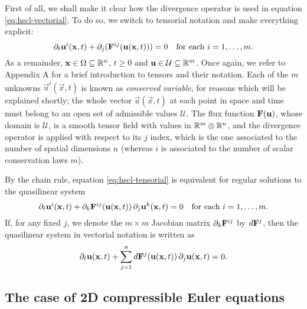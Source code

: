 First of all, we shall make it clear how the divergence operator
is used in equation \eqref{eq:hscl-vectorial}.
To do so, we switch to tensorial notation and make everything explicit:
\begin{equation} \label{eq:hscl-tensorial}
\partial_t \mathbf{u}^i(\mathbf{x},t) + \partial_j (\mathbf{F}^{ij}(\mathbf{u}(\mathbf{x},t))) = 0
\quad \text{for each $i = 1, \dots, m$.}
\end{equation}
As a remainder, $\mathbf{x} \in \Omega \subseteq \mathbb{R}^n$, $t \geq 0$ and
$\mathbf{u} \in \mathcal{U} \subseteq \mathbb{R}^m$.
Once again, we refer to Appendix A for a brief introduction
to tensors and their notation.
Each of the $m$ unknowns $\vec{u}^i(\vec{x},t)$ is known as
\emph{conserved variable}, for reasons which will be explained shortly;
the whole vector $\vec{u}(\vec{x},t)$ at each point in space and time must belong
to an open set of admissible values $\mathcal{U}$.
The flux function $\mathbf{F}(\mathbf{u})$, whose domain is $\mathcal{U}$,
is a smooth tensor field with values in $\mathbb{R}^m \otimes \mathbb{R}^n$,
and the divergence operator is applied with respect
to its $j$ index, which is the one associated to the number
of spatial dimensions $n$ (whereas $i$ is associated to the number of
scalar conservation laws $m$).

By the chain rule, equation \eqref{eq:hscl-tensorial} is equivalent
for regular solutions to the quasilinear system
\begin{equation} \label{hscl-quasilinear-tensorial}
\partial_t \mathbf{u}^i(\mathbf{x},t)
+  \partial_k \mathbf{F}^{ij} (\mathbf{u}(\mathbf{x},t))
\, \partial_j \mathbf{u}^k (\mathbf{x},t) = 0
\quad \text{for each $i = 1, \dots, m$.}
\end{equation}
If, for any fixed $j$, we denote the $m \times m$ Jacobian matrix
$\partial_k \mathbf{F}^{ij}$ by $d\mathbf{F}^j$, then the quasilinear system
in vectorial notation is written as
\begin{equation} \label{hscl-quasilinear-vectorial}
\partial_t \mathbf{u}(\mathbf{x},t)
+ \sum_{j=1}^n d\mathbf{F}^j(\mathbf{u}(\mathbf{x},t))
\, \partial_j \mathbf{u}(\mathbf{x},t) = 0.
\end{equation}



\clearpage


\subsection*{The case of 2D compressible Euler equations}

